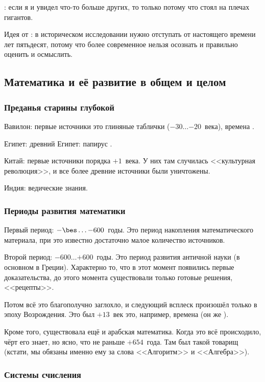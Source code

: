 \documentclass[a4paper,oneside,fleqn,10pt]{article}
\newcommand{\pe}[2]{${#1}\ldots{#2}$}
\begin{document}
: если я и увидел что-то больше других, то только потому
что стоял на плечах гигантов.

Идея от : в историческом исследовании
нужно отступать от настоящего времени лет пятьдесят, потому что более
современное нельзя осознать и правильно оценить и осмыслить.

\subsection{Математика и её развитие в общем и целом}

\subsubsection{Преданья старины глубокой}

Вавилон: первые источники это глиняные таблички (\pe{-30}{-20}~века),
времена .

Египет: древний Египет: папирус .

Китай: первые источники порядка $+1$~века. У них там случилась
<<культурная революция>>, и все более древние источники были
уничтожены.

Индия: ведические знания.

\subsubsection{Периоды развития математики}

Первый период: \pe{-\bes}{-600}~годы. Это период накопления
математического материала, при это известно достаточно малое
количество источников.

Второй период: \pe{-600}{+600}~годы.  Это период развития античной
науки (в основном в Греции).  Характерно то, что в этот момент
появились первые доказательства, до этого момента существовали только
готовые решения, <<рецепты>>.

Потом всё это благополучно заглохло, и следующий всплеск произошёл
только в эпоху Возрождения.  Это был $+13$~век это, например, времена
 (он же ).

Кроме того, существовала ещё и арабская математика.  Когда это всё
происходило, чёрт его знает, но ясно, что не раньше $+654$~года.  Там
был такой товарищ  (кстати, мы обязаны именно ему за
слова <<Алгоритм>> и <<Алгебра>>).

\subsubsection{Системы счисления}
\end{document}
